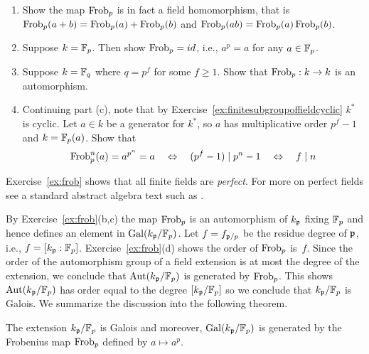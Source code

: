 \begin{exercise}\label{ex:frob}
	\hfill
	\begin{enumerate}
		\item
		Show the map $\operatorname{Frob}_p$ is in fact a field homomorphism,
		that is $\operatorname{Frob}_p(a + b) = \operatorname{Frob}_p(a) + \operatorname{Frob}_p(b)$
		and $\operatorname{Frob}_p(ab) = \operatorname{Frob}_p(a)\operatorname{Frob}_p(b)$.

		\item
		Suppose $k = \mathbb{F}_p$. Then show $\operatorname{Frob}_p = id$, i.e.,
		$a^p = a$ for any $a\in\mathbb{F}_p$.

		\item
		Suppose $k = \mathbb{F}_{q}$ where $q=p^f$ for some $f\geq 1$.
		Show that $\operatorname{Frob}_p:k\to k$ is an automorphism.

		\item
		Continuing part (c), note that by
		Exercise~\ref{ex:finitesubgroupoffieldcyclic}
		$k^*$ is cyclic. Let $a\in k$ be a generator for
		$k^*$, so $a$ has multiplicative order $p^f-1$ and $k = \mathbb{F}_p(a)$.
		Show that
		$$
			\operatorname{Frob}_p^n(a) = a^{p^n} = a
			\quad\Leftrightarrow\quad (p^f - 1) \mid p^n - 1
			\quad\Leftrightarrow\quad f \mid n
		$$
	\end{enumerate}
\end{exercise}

\begin{remark}
	Exercise~\ref{ex:frob} shows that all finite fields
	are \emph{perfect}. For more on perfect fields see
	a standard abstract algebra text such as
	\cite{dummit2004abstract}.
\end{remark}

By Exercise~\ref{ex:frob}(b,c) the map $\operatorname{Frob}_p$ is an
automorphism of $k_{\mathfrak{p}}$ fixing $\mathbb{F}_p$ and hence defines
an element in $\operatorname{Gal}(k_{\mathfrak{p}}/\mathbb{F}_p)$. Let $f = f_{\mathfrak{p}/p}$ be the residue
degree of $\mathfrak{p}$, i.e., $f = [k_{\mathfrak{p}}:\mathbb{F}_p]$.
Exercise~\ref{ex:frob}(d) shows the order of $\operatorname{Frob}_p$ is~$f$.
Since the order of the automorphism group of a field extension
is at most the degree of the extension, we conclude that
$\operatorname{Aut}(k_{\mathfrak{p}}/\mathbb{F}_p)$ is generated by $\operatorname{Frob}_p$. This shows
$\operatorname{Aut}(k_{\mathfrak{p}}/\mathbb{F}_p)$ has order equal to the degree $[k_{\mathfrak{p}}/\mathbb{F}_p]$
so we conclude that $k_{\mathfrak{p}}/\mathbb{F}_p$ is Galois.
We summarize the discussion into the following theorem.

\begin{theorem}\label{thm:galoisgroupfinitefield}
	The extension $k_{\mathfrak{p}}/\mathbb{F}_p$ is Galois and moreover,
	$\operatorname{Gal}(k_{\mathfrak{p}}/\mathbb{F}_p)$ is generated by the Frobenius map
	$\operatorname{Frob}_p$ defined by $a\mapsto a^p$.
\end{theorem}


